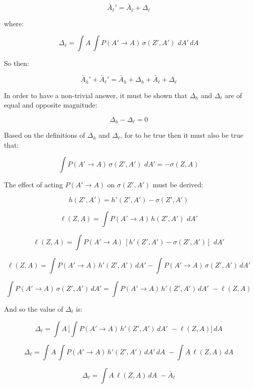 \documentclass{article}
\begin{document}
\begin{equation}
\bar{A}_{\ell}' = \bar{A}_{\ell} + \Delta_\ell
\end{equation}

where:

\begin{equation}
\Delta_\ell = \int A\, \int P(A' \rightarrow A)\, \sigma(Z',A')\,\, dA'\, dA
\end{equation}

So then: 

\begin{equation}
\bar{A}_{h}' + \bar{A}_{\ell}' = \bar{A}_{h} + \Delta_h + \bar{A}_{\ell} + \Delta_\ell
\end{equation}

In order to have a non-trivial answer, it must be shown that $\Delta_h$ and $\Delta_\ell$ are of equal and opposite magnitude:

\begin{equation}
\Delta_h - \Delta_\ell = 0
\end{equation}

Based on the definitions of $\Delta_h$ and $\Delta_\ell$, for to be true then it must also be true that: 

\begin{equation}
\int P(A' \rightarrow A)\, \sigma(Z',A')\,\, dA' = -\sigma(Z,A)
\end{equation}

The effect of acting $P(A' \rightarrow A)$ on $\sigma(Z',A')$ must be derived: 

\[ h(Z',A') = h'(Z',A') - \sigma(Z',A') \]

\[ \ell(Z,A) = \int P(A' \rightarrow A)\, h(Z',A')\,\, dA' \]

\[ \ell(Z,A) = \int P(A' \rightarrow A)\, [h'(Z',A') - \sigma(Z',A')]\,\, dA' \]

\[ \ell(Z,A) = \int P(A' \rightarrow A)\, h'(Z',A')\, dA' - \int P(A' \rightarrow A)\, \sigma(Z',A')\, dA' \]

\[ \int P(A' \rightarrow A)\, \sigma(Z',A')\, dA' = \int P(A' \rightarrow A)\, h'(Z',A')\, dA'\,\, - \ell(Z,A) \]

And so the value of $\Delta_\ell$ is:

\[ \Delta_\ell = \int A\, \Bigg[ \int P(A' \rightarrow A)\, h'(Z',A')\, dA'\,\, - \ell(Z,A) \Bigg]  \, dA \]

\[ \Delta_\ell = \int A\, \int P(A' \rightarrow A)\, h'(Z',A')\, dA'\,dA \,\, - \int A\, \ell(Z,A) \, dA \]

\[ \Delta_\ell = \int A\, \ell(Z,A)\,dA \,\, - \bar{A}_\ell \]
\end{document}
